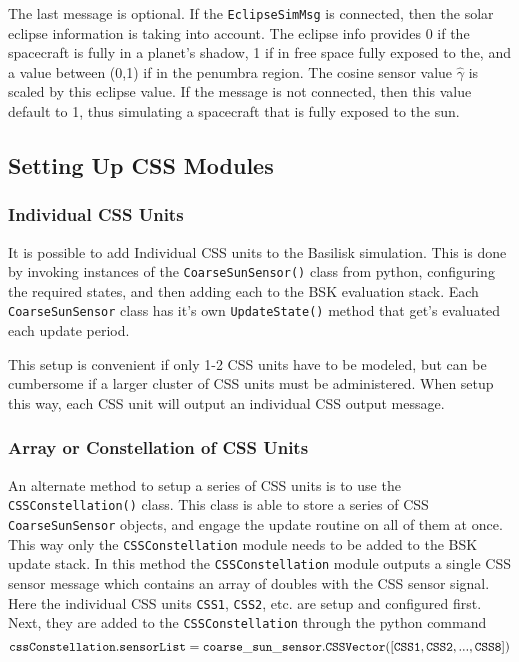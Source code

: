 The last message is optional.  If the {\tt EclipseSimMsg} is connected, then the solar eclipse information is taking into account.  The eclipse info provides 0 if the spacecraft is fully in a planet's shadow, 1 if in free space fully exposed to the, and a value between (0,1) if in the penumbra region.  The cosine sensor value $\hat\gamma$ is scaled by this eclipse value.  If the message is not connected, then this value default to 1, thus simulating a spacecraft that is fully exposed to the sun.  



\subsection{Setting Up CSS Modules}
\subsubsection{Individual CSS Units}
It is possible to add Individual CSS units to the Basilisk simulation.   This is done by invoking instances of the {\tt CoarseSunSensor()} class from python, configuring the required states, and then adding each to the BSK evaluation stack.  Each {\tt CoarseSunSensor} class has it's own {\tt UpdateState()} method that get's evaluated each update period.  

This setup is convenient if only 1-2 CSS units have to be modeled, but can be cumbersome if a larger cluster of CSS units must be administered.  When setup this way, each CSS unit will output an individual CSS output message.

\subsubsection{Array or Constellation of CSS Units}
An alternate method to setup a series of CSS units is to use the {\tt CSSConstellation()} class.  This class is able to store a series of CSS {\tt CoarseSunSensor} objects, and engage the update routine on all of them at once.  This way only the {\tt CSSConstellation} module needs to be added to the BSK update stack.  In this method the 
{\tt CSSConstellation} module outputs a single CSS sensor message which contains an array of doubles with the CSS sensor signal.  Here the individual CSS units {\tt CSS1}, {\tt CSS2}, etc. are setup and configured first.  Next, they are added to the {\tt CSSConstellation} through the python command
$$
	{\tt cssConstellation.sensorList = coarse\_sun\_sensor.CSSVector([CSS1, CSS2, ..., CSS8])}
$$

